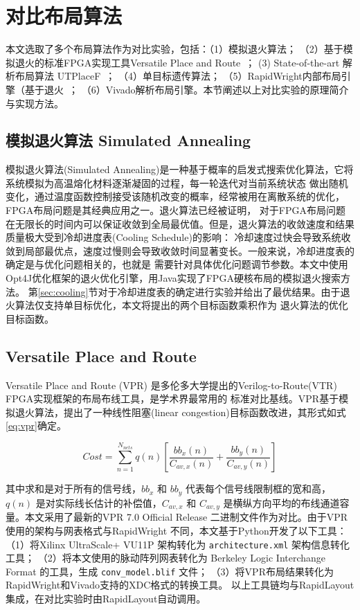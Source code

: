 \section{对比布局算法}
本文选取了多个布局算法作为对比实验，包括：（1）模拟退火算法； （2）基于模拟退火的标准FPGA实现工具Versatile Place and Route~\cite{vtr2014}；
(3) State-of-the-art 解析布局算法 UTPlaceF~\cite{li2017utplacef}； （4）单目标遗传算法； （5）RapidWright内部布局引擎（基于退火~\cite{lavin2018rapidwright}；
（6）Vivado解析布局引擎。本节阐述以上对比实验的原理简介与实现方法。

\subsection{模拟退火算法 Simulated Annealing}
\label{sec:sa}

模拟退火算法(Simulated Annealing)是一种基于概率的启发式搜索优化算法，它将系统模拟为高温熔化材料逐渐凝固的过程，每一轮迭代对当前系统状态
做出随机变化，通过温度函数控制接受该随机改变的概率，经常被用在离散系统的优化，FPGA布局问题是其经典应用之一。退火算法已经被证明，
对于FPGA布局问题在无限长的时间内可以保证收敛到全局最优值。但是，退火算法的收敛速度和结果质量极大受到冷却进度表(Cooling Schedule)的影响：
冷却速度过快会导致系统收敛到局部最优点，速度过慢则会导致收敛时间显著变长。一般来说，冷却进度表的确定是与优化问题相关的，也就是
需要针对具体优化问题调节参数。本文中使用Opt4J优化框架的退火优化引擎，用Java实现了FPGA硬核布局的模拟退火搜索方法。
第\ref{sec:cooling}节对于冷却进度表的确定进行实验并给出了最优结果。由于退火算法仅支持单目标优化，本文将提出的两个目标函数乘积作为
退火算法的优化目标函数。

\subsection{Versatile Place and Route}

Versatile Place and Route (VPR) 是多伦多大学提出的Verilog-to-Route(VTR)~\cite{vtr2014} FPGA实现框架的布局布线工具，是学术界最常用的
标准对比基线。VPR基于模拟退火算法，提出了一种线性阻塞(linear congestion)目标函数改进，其形式如式\ref{eq:vpr}确定。

\begin{equation}
Cost = \sum_{n=1}^{N_{nets}} q(n) [ \frac{bb_x(n)}{C_{av,x}(n)} + \frac{bb_y(n)}{C_{av,y}(n)} ] 
\label{eq:vpr}
\end{equation}

其中求和是对于所有的信号线，$bb_x$ 和 $bb_y$ 代表每个信号线限制框的宽和高，$q(n)$ 是对实际线长估计的补偿值，$C_{av,x}$ 和 $C_{av,y}$
是横纵方向平均的布线通道容量。本文采用了最新的VPR 7.0 Official Release 二进制文件作为对比。由于VPR使用的架构与网表格式与RapidWright
不同，本文基于Python开发了以下工具：（1）将Xilinx UltraScale+ VU11P 架构转化为 \texttt{architecture.xml} 架构信息转化工具；
（2）将本文使用的脉动阵列网表转化为 Berkeley Logic Interchange Format 的工具，生成 \texttt{conv\_model.blif} 文件；
（3）将VPR布局结果转化为RapidWright和Vivado支持的XDC格式的转换工具。
以上工具链均与RapidLayout集成，在对比实验时由RapidLayout自动调用。

